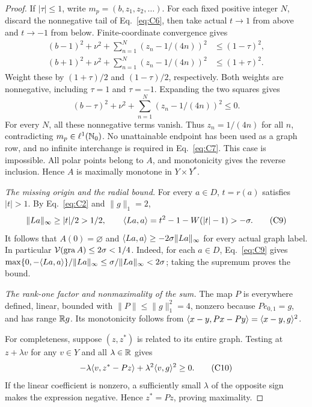 \begin{proof}
If $|\tau|\le1$, write $m_p=(b,z_1,z_2,\ldots)$. For each fixed positive
integer $N$, discard the nonnegative tail of Eq.~\eqref{eq:C6}, then
take actual $t\to1$ from above and $t\to-1$ from below.
Finite-coordinate convergence gives
\begin{equation}
\begin{aligned}
(b-1)^2+\nu^2+\sum_{n=1}^N(z_n-1/(4n))^2&\le(1-\tau)^2,\\
(b+1)^2+\nu^2+\sum_{n=1}^N(z_n-1/(4n))^2&\le(1+\tau)^2.
\end{aligned}
\tag{C7}\label{eq:C7}
\end{equation}
Weight these by $(1+\tau)/2$ and $(1-\tau)/2$, respectively. Both
weights are nonnegative, including $\tau=1$ and $\tau=-1$. Expanding
the two squares gives
\begin{equation}
(b-\tau)^2+\nu^2+\sum_{n=1}^N(z_n-1/(4n))^2\le0.
\tag{C8}\label{eq:C8}
\end{equation}
For every $N$, all these nonnegative terms vanish. Thus $z_n=1/(4n)$ for
all $n$, contradicting $m_p\in\ell^1(\mathbb N_0)$. No unattainable endpoint
has been used as a graph row, and no infinite interchange is required in
Eq.~\eqref{eq:C7}. This case is impossible. All polar points belong to
$A$, and monotonicity gives the reverse inclusion. Hence $A$ is maximally
monotone in $Y\times Y^*$.

\noindent\textit{The missing origin and the radial bound.}
\label{sec:C5}
For every $a\in D$, $t=r(a)$ satisfies $|t|>1$. By Eq.~\eqref{eq:C2}
and $\|g\|_1=2$,
\begin{equation}
\|La\|_\infty\ge|t|/2>1/2,\qquad
\langle La,a\rangle=t^2-1-W(|t|-1)>-\sigma.
\tag{C9}\label{eq:C9}
\end{equation}
It follows that $A(0)=\varnothing$ and
$\langle La,a\rangle\ge-2\sigma\|La\|_\infty$ for every actual graph label.
In particular $\mathcal V(\operatorname{gra} A)\le2\sigma<1/4$.
Indeed, for each $a\in D$, Eq.~\eqref{eq:C9} gives
$\max\{0,-\langle La,a\rangle\}/\|La\|_\infty
\le\sigma/\|La\|_\infty<2\sigma$; taking the supremum proves the bound.

\noindent\textit{The rank-one factor and nonmaximality of the sum.}
\label{sec:C6}
The map $P$ is everywhere defined, linear, bounded with
$\|P\|\le\|g\|_1^2=4$, nonzero because $Pe_{0,1}=g$, and has range $\mathbb R g$.
Its monotonicity follows from $\langle x-y,Px-Py\rangle=\langle x-y,g\rangle^2$.

For completeness, suppose $(z,z^*)$ is related to its entire graph.
Testing at $z+\lambda v$ for any $v\in Y$ and all $\lambda\in\mathbb R$ gives
\begin{equation}
-\lambda\langle v,z^*-Pz\rangle+\lambda^2\langle v,g\rangle^2\ge0.
\tag{C10}\label{eq:C10}
\end{equation}
If the linear coefficient is nonzero, a sufficiently small $\lambda$ of
the opposite sign makes the expression negative. Hence $z^*=Pz$, proving maximality.


\end{proof}
